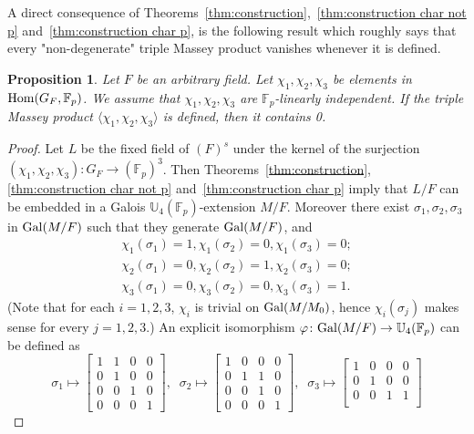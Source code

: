 \documentclass[12pt,leqno]{amsart}
\theoremstyle{plain}
\newtheorem{prop}[thm]{Proposition}
\theoremstyle{definition}
\newcommand{\F}{{\mathbb F}}
\newcommand{\U}{{\mathbb U}}
\begin{document}
A direct consequence of Theorems~\ref{thm:construction},~\ref{thm:construction char not p} and~\ref{thm:construction char p}, is the following result which roughly says that every "non-degenerate" triple Massey product vanishes whenever it is defined.
\begin{prop}
\label{prop:nondegenerate Massey}
Let $F$ be an arbitrary field. Let $\chi_1,\chi_2,\chi_3$ be elements in ${\rm Hom}(G_F,\F_p)$. We assume that $\chi_1,\chi_2,\chi_3$ are $\F_p$-linearly independent. If the triple Massey product $\langle \chi_1,\chi_2,\chi_3\rangle$ is defined, then it contains 0.
\end{prop}
\begin{proof}Let $L$ be the fixed field of $(F)^s$ under the kernel of the surjection $(\chi_1,\chi_2,\chi_3)\colon G_{F}\to (\F_p)^3$. Then Theorems~\ref{thm:construction}, \ref{thm:construction char not p} and~\ref{thm:construction char p} imply that $L/F$  can be embedded in a Galois $\U_4(\F_p)$-extension $M/F$. Moreover there exist $\sigma_1,\sigma_2,\sigma_3$ in ${\rm Gal}(M/F)$ such that they generate ${\rm Gal}(M/F)$, and 
  \[
  \begin{aligned}
  \chi_1(\sigma_1)=1,   \chi_1(\sigma_2)=0,   \chi_1(\sigma_3)=0;\\
  \chi_2(\sigma_1)=0,   \chi_2(\sigma_2)=1,   \chi_2(\sigma_3)=0;\\
  \chi_3(\sigma_1)=0,   \chi_3(\sigma_2)=0,   \chi_3(\sigma_3)=1.
  \end{aligned}
  \]
  (Note that for each $i=1,2,3$, $\chi_i$ is trivial on ${\rm Gal}(M/M_0)$, hence $\chi_i(\sigma_j)$ makes sense for every $j=1,2,3$.)
An explicit isomorphism $\varphi\colon {\rm Gal}(M/F)\to \U_4(\F_p)$ can be defined as
\[
\sigma_1 \mapsto \begin{bmatrix}
1& 1 & 0 & 0\\
0& 1 & 0 & 0\\
0& 0 & 1 & 0\\
0& 0 & 0 & 1
\end{bmatrix}, \; \;
\sigma_2\mapsto  \begin{bmatrix}
1& 0 & 0 & 0\\
0& 1 & 1 & 0\\
0& 0 & 1 & 0\\
0& 0 & 0 & 1
\end{bmatrix}, \;\;
 \sigma_3\mapsto \begin{bmatrix}
1& 0 & 0 & 0\\
0& 1 & 0 & 0\\
0& 0 & 1 & 1\\

\end{bmatrix}\]
\end{proof}
\end{document}
